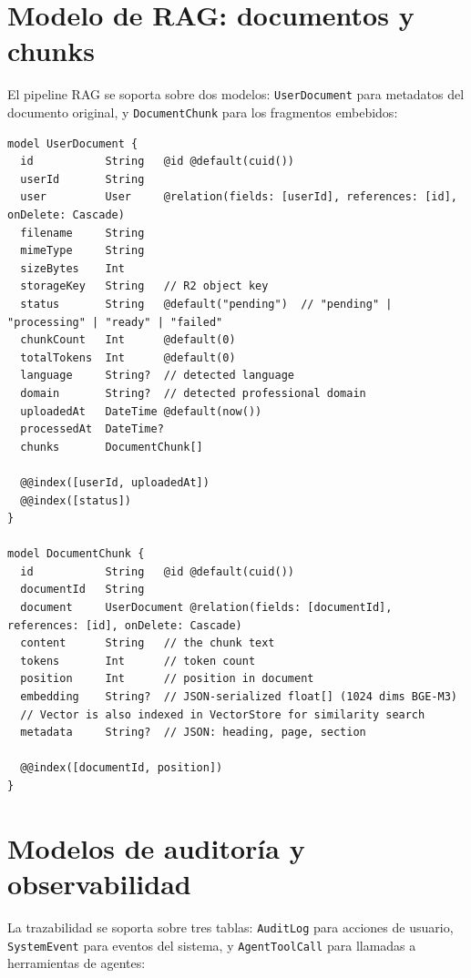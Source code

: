 \documentclass[10pt,a4paper,oneside]{report}
\begin{document}
\section{Modelo de RAG: documentos y chunks}
El pipeline RAG se soporta sobre dos modelos: \texttt{UserDocument} para metadatos del documento original, y \texttt{DocumentChunk} para los fragmentos embebidos:

\begin{lstlisting}[style=sql,caption={Modelos UserDocument y DocumentChunk}]
model UserDocument {
  id           String   @id @default(cuid())
  userId       String
  user         User     @relation(fields: [userId], references: [id], onDelete: Cascade)
  filename     String
  mimeType     String
  sizeBytes    Int
  storageKey   String   // R2 object key
  status       String   @default("pending")  // "pending" | "processing" | "ready" | "failed"
  chunkCount   Int      @default(0)
  totalTokens  Int      @default(0)
  language     String?  // detected language
  domain       String?  // detected professional domain
  uploadedAt   DateTime @default(now())
  processedAt  DateTime?
  chunks       DocumentChunk[]

  @@index([userId, uploadedAt])
  @@index([status])
}

model DocumentChunk {
  id           String   @id @default(cuid())
  documentId   String
  document     UserDocument @relation(fields: [documentId], references: [id], onDelete: Cascade)
  content      String   // the chunk text
  tokens       Int      // token count
  position     Int      // position in document
  embedding    String?  // JSON-serialized float[] (1024 dims BGE-M3)
  // Vector is also indexed in VectorStore for similarity search
  metadata     String?  // JSON: heading, page, section

  @@index([documentId, position])
}
\end{lstlisting}

\section{Modelos de auditoría y observabilidad}
La trazabilidad se soporta sobre tres tablas: \texttt{AuditLog} para acciones de usuario, \texttt{SystemEvent} para eventos del sistema, y \texttt{AgentToolCall} para llamadas a herramientas de agentes:
\end{document}
